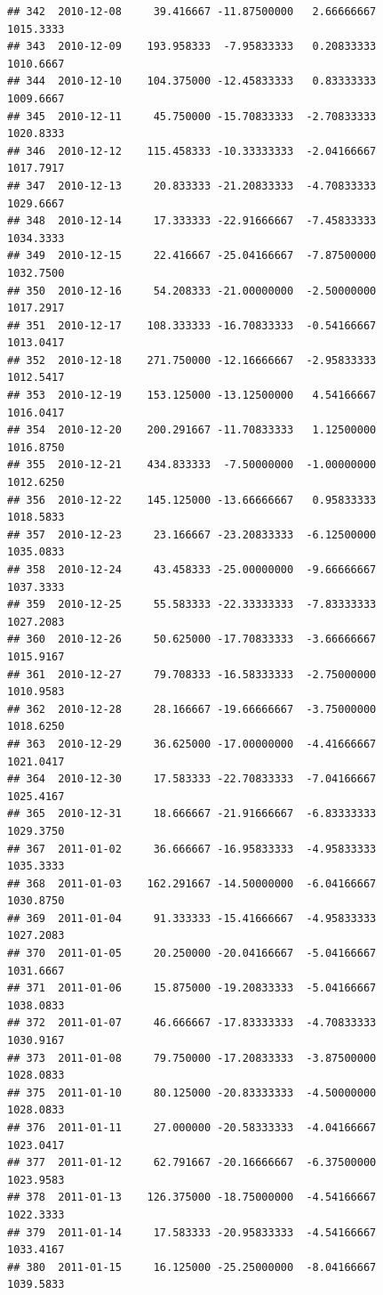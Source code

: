 \documentclass[
]{article}
\begin{document}
\begin{verbatim}
## 342  2010-12-08     39.416667 -11.87500000   2.66666667    1015.3333
## 343  2010-12-09    193.958333  -7.95833333   0.20833333    1010.6667
## 344  2010-12-10    104.375000 -12.45833333   0.83333333    1009.6667
## 345  2010-12-11     45.750000 -15.70833333  -2.70833333    1020.8333
## 346  2010-12-12    115.458333 -10.33333333  -2.04166667    1017.7917
## 347  2010-12-13     20.833333 -21.20833333  -4.70833333    1029.6667
## 348  2010-12-14     17.333333 -22.91666667  -7.45833333    1034.3333
## 349  2010-12-15     22.416667 -25.04166667  -7.87500000    1032.7500
## 350  2010-12-16     54.208333 -21.00000000  -2.50000000    1017.2917
## 351  2010-12-17    108.333333 -16.70833333  -0.54166667    1013.0417
## 352  2010-12-18    271.750000 -12.16666667  -2.95833333    1012.5417
## 353  2010-12-19    153.125000 -13.12500000   4.54166667    1016.0417
## 354  2010-12-20    200.291667 -11.70833333   1.12500000    1016.8750
## 355  2010-12-21    434.833333  -7.50000000  -1.00000000    1012.6250
## 356  2010-12-22    145.125000 -13.66666667   0.95833333    1018.5833
## 357  2010-12-23     23.166667 -23.20833333  -6.12500000    1035.0833
## 358  2010-12-24     43.458333 -25.00000000  -9.66666667    1037.3333
## 359  2010-12-25     55.583333 -22.33333333  -7.83333333    1027.2083
## 360  2010-12-26     50.625000 -17.70833333  -3.66666667    1015.9167
## 361  2010-12-27     79.708333 -16.58333333  -2.75000000    1010.9583
## 362  2010-12-28     28.166667 -19.66666667  -3.75000000    1018.6250
## 363  2010-12-29     36.625000 -17.00000000  -4.41666667    1021.0417
## 364  2010-12-30     17.583333 -22.70833333  -7.04166667    1025.4167
## 365  2010-12-31     18.666667 -21.91666667  -6.83333333    1029.3750
## 367  2011-01-02     36.666667 -16.95833333  -4.95833333    1035.3333
## 368  2011-01-03    162.291667 -14.50000000  -6.04166667    1030.8750
## 369  2011-01-04     91.333333 -15.41666667  -4.95833333    1027.2083
## 370  2011-01-05     20.250000 -20.04166667  -5.04166667    1031.6667
## 371  2011-01-06     15.875000 -19.20833333  -5.04166667    1038.0833
## 372  2011-01-07     46.666667 -17.83333333  -4.70833333    1030.9167
## 373  2011-01-08     79.750000 -17.20833333  -3.87500000    1028.0833
## 375  2011-01-10     80.125000 -20.83333333  -4.50000000    1028.0833
## 376  2011-01-11     27.000000 -20.58333333  -4.04166667    1023.0417
## 377  2011-01-12     62.791667 -20.16666667  -6.37500000    1023.9583
## 378  2011-01-13    126.375000 -18.75000000  -4.54166667    1022.3333
## 379  2011-01-14     17.583333 -20.95833333  -4.54166667    1033.4167
## 380  2011-01-15     16.125000 -25.25000000  -8.04166667    1039.5833

\end{verbatim}
\end{document}
